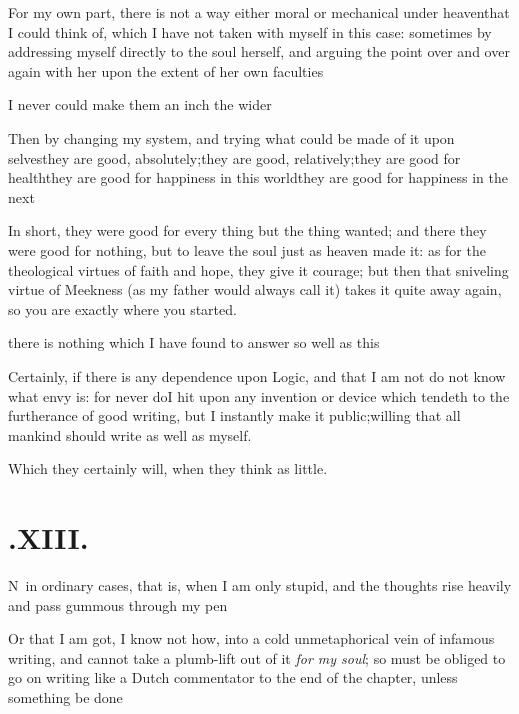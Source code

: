 \documentclass{article}
\begin{document}
For my own part, there is not a way either moral or mechanical
under heaven\pb that I could think of, which I have not taken with
myself in this case: sometimes by addressing myself directly to the
soul herself, and arguing the point over and over again with her
upon the extent of her own faculties\tsh

\tsh I never could make them an inch the
wider\tsh

Then by changing my system, and trying what could be made of it
upon
selves\tsk they are good,
absolutely;\tsk they are good, relatively;\tsk they are good
for health\tsk they are good for happiness in this
world\tsk they are good for happiness in the
next\tsh

\newpage
In short, they were good for every thing but the thing wanted;
and there they were good for nothing, but to leave the soul just as
heaven made it: as for the theological virtues of faith and hope,
they give it courage; but then that snive\-ling virtue of Meekness
(as my father would always call it) takes it quite away again, so
you are exactly where you started.

\noindent
{}
there is nothing which I
have found to answer so well as this\tsh

\enlargethispage\baselineskip
\tsh Certainly, if there is any depend\-ence upon Logic, and that I am not
do not know what envy is: for never do\pb I hit upon any invention or
device which tendeth to the furtherance of good writing, but I instantly make it
public;\break willing that all mankind should write as well as myself.

\tsh Which they certainly will, when they think as little.

\newpage
\section{.\enspace XIII.}

\lettrine{N}{\,} in ordinary cases, that is, when
I am only stupid, and the thoughts rise heavily and pass gummous
through my pen\tsh

Or that I am got, I know not how, into a cold unmetaphorical vein of infamous
writing, and cannot take a plumb-lift out of it \textit{for my soul}; so must be
obliged to go on writing like a Dutch commentator to the end of the chapter, unless
something be done\tsh
\end{document}
